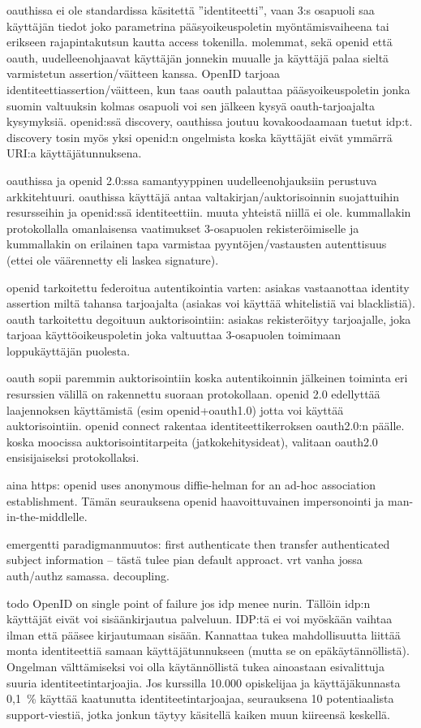 \documentclass[finnish,gradu]{tktltiki}
\begin{document}
  oauthissa ei ole standardissa käsitettä ''identiteetti'', vaan 3:s osapuoli saa käyttäjän tiedot joko parametrina pääsyoikeuspoletin myöntämisvaiheena tai erikseen rajapintakutsun kautta access tokenilla.
  molemmat, sekä openid että oauth, uudelleenohjaavat käyttäjän jonnekin muualle ja käyttäjä palaa sieltä varmistetun assertion/väitteen kanssa. OpenID tarjoaa identiteettiassertion/väitteen, kun taas oauth palauttaa pääsyoikeuspoletin jonka suomin valtuuksin kolmas osapuoli voi sen jälkeen kysyä oauth-tarjoajalta kysymyksiä. openid:ssä discovery, oauthissa joutuu kovakoodaamaan tuetut idp:t. discovery tosin myös yksi openid:n ongelmista koska käyttäjät eivät ymmärrä URI:a käyttäjätunnuksena.

  oauthissa ja openid 2.0:ssa samantyyppinen uudelleenohjauksiin perustuva arkkitehtuuri. oauthissa käyttäjä antaa valtakirjan/auktorisoinnin suojattuihin resursseihin ja openid:ssä identiteettiin. muuta yhteistä niillä ei ole. kummallakin protokollalla omanlaisensa vaatimukset 3-osapuolen rekisteröimiselle ja kummallakin on erilainen tapa varmistaa pyyntöjen/vastausten autenttisuus (ettei ole väärennetty eli laskea signature).

  openid tarkoitettu federoitua autentikointia varten: asiakas vastaanottaa identity assertion miltä tahansa tarjoajalta (asiakas voi käyttää whitelistiä vai blacklistiä).
  oauth tarkoitettu degoituun auktorisointiin: asiakas rekisteröityy tarjoajalle, joka tarjoaa käyttöoikeuspoletin joka valtuuttaa 3-osapuolen toimimaan loppukäyttäjän puolesta.

  oauth sopii paremmin auktorisointiin koska autentikoinnin jälkeinen toiminta eri resurssien välillä on rakennettu suoraan protokollaan. openid 2.0 edellyttää laajennoksen käyttämistä (esim openid+oauth1.0) jotta voi käyttää auktorisointiin. openid connect rakentaa identiteettikerroksen oauth2.0:n päälle. koska moocissa auktorisointitarpeita (jatkokehitysideat), valitaan oauth2.0 ensisijaiseksi protokollaksi.

  aina https: openid uses anonymous diffie-helman for an ad-hoc association establishment. Tämän seurauksena openid haavoittuvainen impersonointi ja man-in-the-middlelle.

  emergentti paradigmanmuutos: first authenticate then transfer authenticated subject information -- tästä tulee pian default approact. vrt vanha jossa auth/authz samassa. decoupling.


  todo
  OpenID on single point of failure jos idp menee nurin. Tällöin idp:n käyttäjät eivät voi sisäänkirjautua palveluun. IDP:tä ei voi myöskään vaihtaa ilman että pääsee kirjautumaan sisään. Kannattaa tukea mahdollisuutta liittää monta identiteettiä samaan käyttäjätunnukseen (mutta se on epäkäytännöllistä). Ongelman välttämiseksi voi olla käytännöllistä tukea ainoastaan esivalittuja suuria identiteetintarjoajia. Jos kurssilla 10.000 opiskelijaa ja käyttäjäkunnasta 0,1~\% käyttää kaatunutta identiteetintarjoajaa, seurauksena 10 potentiaalista support-viestiä, jotka jonkun täytyy käsitellä kaiken muun kiireensä keskellä.
\end{document}

